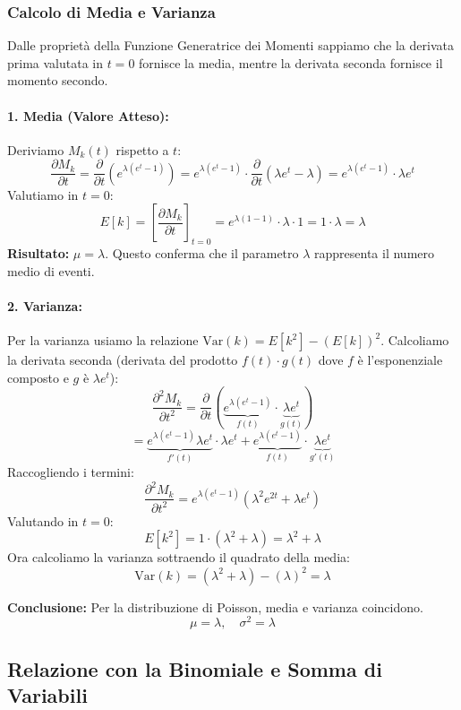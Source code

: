 \documentclass{article}
\theoremstyle{remark}
\begin{document}
\subsubsection{Calcolo di Media e Varianza}
Dalle proprietà della Funzione Generatrice dei Momenti sappiamo che la derivata prima valutata in $t=0$ fornisce la media, mentre la derivata seconda fornisce il momento secondo.

\paragraph{1. Media (Valore Atteso):}
Deriviamo $M_k(t)$ rispetto a $t$:
\[
\frac{\partial M_k}{\partial t} = \frac{\partial}{\partial t} \left( e^{\lambda(e^t - 1)} \right) = e^{\lambda(e^t - 1)} \cdot \frac{\partial}{\partial t}(\lambda e^t - \lambda) = e^{\lambda(e^t - 1)} \cdot \lambda e^t
\]
Valutiamo in $t=0$:
\[
E[k] = \left[ \frac{\partial M_k}{\partial t} \right]_{t=0} = e^{\lambda(1-1)} \cdot \lambda \cdot 1 = 1 \cdot \lambda = \lambda
\]
\textbf{Risultato:} $\mu = \lambda$. Questo conferma che il parametro $\lambda$ rappresenta il numero medio di eventi.

\paragraph{2. Varianza:}
Per la varianza usiamo la relazione $\text{Var}(k) = E[k^2] - (E[k])^2$.
Calcoliamo la derivata seconda (derivata del prodotto $f(t) \cdot g(t)$ dove $f$ è l'esponenziale composto e $g$ è $\lambda e^t$):
\[
\frac{\partial^2 M_k}{\partial t^2} = \frac{\partial}{\partial t} \left( \underbrace{e^{\lambda(e^t - 1)}}_{f(t)} \cdot \underbrace{\lambda e^t}_{g(t)} \right)
\]
\[
= \underbrace{e^{\lambda(e^t - 1)} \lambda e^t}_{f'(t)} \cdot \lambda e^t + \underbrace{e^{\lambda(e^t - 1)}}_{f(t)} \cdot \underbrace{\lambda e^t}_{g'(t)}
\]
Raccogliendo i termini:
\[
\frac{\partial^2 M_k}{\partial t^2} = e^{\lambda(e^t - 1)} (\lambda^2 e^{2t} + \lambda e^t)
\]
Valutando in $t=0$:
\[
E[k^2] = 1 \cdot (\lambda^2 + \lambda) = \lambda^2 + \lambda
\]
Ora calcoliamo la varianza sottraendo il quadrato della media:
\[
\text{Var}(k) = (\lambda^2 + \lambda) - (\lambda)^2 = \lambda
\]

\textbf{Conclusione:} Per la distribuzione di Poisson, media e varianza coincidono.
\begin{equation}
\boxed{\mu = \lambda, \quad \sigma^2 = \lambda}
\end{equation}

\subsection{Relazione con la Binomiale e Somma di Variabili}
\end{document}
